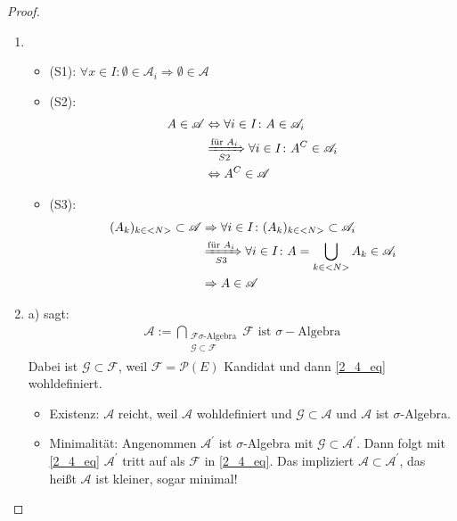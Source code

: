 \begin{proof}
	\begin{enumerate}[label=(\alph*)]
		\item 
		\begin{itemize}
			\item (S1): $\forall x \in I\colon \emptyset \in \mathscr{A}_i \Rightarrow \emptyset \in \mathscr{A}$
			\item (S2): 
			\begin{align}
				A \in \mathscr{A} &\Leftrightarrow \forall i \in I \colon A \in \mathscr{A}_i\notag \\
				&\xRightarrow[S2]{\text{für }A_i} \forall i \in I \colon A^C \in \mathscr{A}_i \notag \\
				&\Leftrightarrow A^C \in \mathscr{A} \notag
			\end{align}
			\item (S3): 
			\begin{align}
				(A_k)_{k \in <N>} \subset \mathscr{A} &\Rightarrow \forall i \in I \colon (A_k)_{k \in <N>} \subset \mathscr{A}_i\notag \\
				&\xRightarrow[S3]{\text{für }A_i} \forall i \in I \colon A = \bigcup_{k\in <N>} A_k \in \mathscr{A}_i\notag \\
				&\Rightarrow A \in \mathscr{A}\notag
			\end{align} 
		\end{itemize}
		\item a) sagt:
			\begin{align}
				\mathscr{A} := \bigcap_{\substack{\mathscr{F} \sigma\text{-Algebra}\\ \mathscr{G} \subset \mathscr{F}}} \mathscr{F} \text{ ist } \sigma-\text{Algebra} \label{2_4_eq} \tag{\ast}
			\end{align}
		Dabei ist $\mathscr{G} \subset \mathscr{F}$, weil $\mathscr{F}=\mathscr{P}(E)$ Kandidat und dann \eqref{2_4_eq} wohldefiniert.
		\begin{itemize}
			\item Existenz: $\mathscr{A}$ reicht, weil $\mathscr{A}$ wohldefiniert und $\mathscr{G} \subset \mathscr{A}$ und $\mathscr{A}$ ist $\sigma$-Algebra.
			\item Minimalität: Angenommen $\mathscr{A}^{'}$ ist $\sigma$-Algebra mit $\mathscr{G} \subset \mathscr{A}^{'}$. Dann folgt mit \eqref{2_4_eq} $\mathscr{A}^{'}$ tritt auf als $\mathscr{F}$ in \eqref{2_4_eq}. Das impliziert $\mathscr{A} \subset \mathscr{A}^{'}$, das heißt $\mathscr{A}$ ist kleiner, sogar minimal!
		\end{itemize}
	\end{enumerate}
\end{proof}

